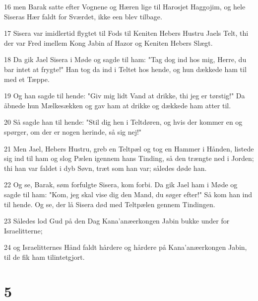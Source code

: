 \par 16 men Barak satte efter Vognene og Hæren lige til Harosjet Haggojim, og hele Siseras Hær faldt for Sværdet, ikke een blev tilbage.
\par 17 Sisera var imidlertid flygtet til Fods til Keniten Hebers Hustru Jaels Telt, thi der var Fred imellem Kong Jabin af Hazor og Keniten Hebers Slægt.
\par 18 Da gik Jael Sisera i Møde og sagde til ham: "Tag dog ind hos mig, Herre, du bar intet at frygte!" Han tog da ind i Teltet hos hende, og hun dækkede ham til med et Tæppe.
\par 19 Og han sagde til hende: "Giv mig lidt Vand at drikke, thi jeg er tørstig!" Da åbnede hun Mælkesækken og gav ham at drikke og dækkede ham atter til.
\par 20 Så sagde han til hende: "Stil dig hen i Teltdøren, og hvis der kommer en og spørger, om der er nogen herinde, så sig nej!"
\par 21 Men Jael, Hebers Hustru, greb en Teltpæl og tog en Hammer i Hånden, listede sig ind til ham og slog Pælen igennem hans Tinding, så den trængte ned i Jorden; thi han var faldet i dyb Søvn, træt som han var; således døde han.
\par 22 Og se, Barak, søm forfulgte Sisera, kom forbi. Da gik Jael ham i Møde og sagde til ham: "Kom, jeg skal vise dig den Mand, du søger efter!" Så kom han ind til hende. Og se, der lå Sisera død med Teltpælen gennem Tindingen.
\par 23 Således lod Gud på den Dag Kana'anæerkongen Jabin bukke under for Israelitterne;
\par 24 og Israelitternes Hånd faldt hårdere og hårdere på Kana'anæerkongen Jabin, til de fik ham tilintetgjort.

\chapter{5}

